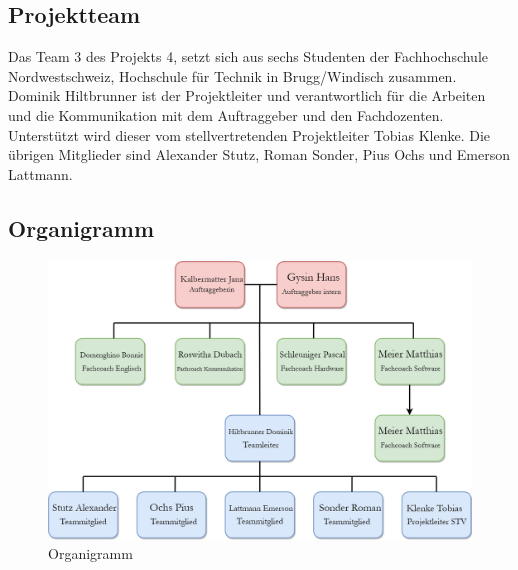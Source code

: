 \documentclass[10pt,a4paper,oneside]{99_fhnwreport}
\begin{document}
\subsection{Projektteam}\label{subsec:projektteam}
Das Team 3 des Projekts 4, setzt sich aus sechs Studenten der Fachhochschule Nordwestschweiz, Hochschule für Technik in Brugg/Windisch zusammen. Dominik Hiltbrunner ist der Projektleiter und verantwortlich für die Arbeiten und die Kommunikation mit dem Auftraggeber und den Fachdozenten. Unterstützt wird dieser vom stellvertretenden Projektleiter Tobias Klenke. Die übrigen Mitglieder sind Alexander Stutz, Roman Sonder, Pius Ochs und Emerson Lattmann. 
\newpage
\subsection{Organigramm}\label{subsec:organigramm}

\begin{figure}[htbp]
	\centering
	\includegraphics[width=13.5cm]{pro4E_Struktur.png}
		\caption{Organigramm}
\end{figure}


\newpage

\end{document}
